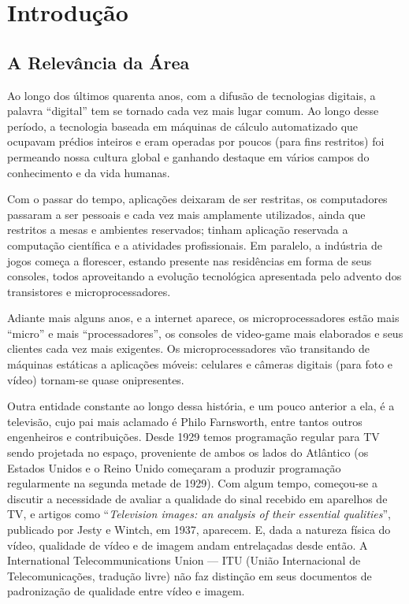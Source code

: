 \documentclass[a4paper]{book}
\begin{document}
\chapter{Introdução}

	\section{A Relevância da Área}
	Ao longo dos últimos quarenta anos, com a difusão de tecnologias digitais, a palavra ``digital'' tem se tornado cada vez mais lugar comum. Ao longo desse período, a tecnologia baseada em máquinas de cálculo automatizado que ocupavam prédios inteiros e eram operadas por poucos (para fins restritos) foi permeando nossa cultura global e ganhando destaque em vários campos do conhecimento e da vida humanas.

	Com o passar do tempo, aplicações deixaram de ser restritas, os computadores passaram a ser pessoais e cada vez mais amplamente utilizados, ainda que restritos a mesas e ambientes reservados; tinham aplicação reservada a computação científica e a atividades profissionais. Em paralelo, a indústria de jogos começa a florescer, estando presente nas residências em forma de seus consoles, todos aproveitando a evolução tecnológica apresentada pelo advento dos transistores e microprocessadores.

	Adiante mais alguns anos, e a internet aparece, os microprocessadores estão mais ``micro'' e mais ``processadores'', os consoles de video-game mais elaborados e seus clientes cada vez mais exigentes. Os microprocessadores vão transitando de máquinas estáticas a aplicações móveis: celulares e câmeras digitais (para foto e vídeo) tornam-se quase onipresentes.

	Outra entidade constante ao longo dessa história, e um pouco anterior a ela, é a televisão, cujo pai mais aclamado é Philo Farnsworth, entre tantos outros engenheiros e contribuições. Desde 1929 temos programação regular para TV sendo projetada no espaço, proveniente de ambos os lados do Atlântico (os Estados Unidos e o Reino Unido começaram a produzir programação regularmente na segunda metade de 1929).
	Com algum tempo, começou-se a discutir a necessidade de avaliar a qualidade do sinal recebido em aparelhos de TV, e artigos como ``{\em Television images: an analysis of their essential qualities}'', publicado por Jesty e Wintch, em 1937, aparecem. E, dada a natureza física do vídeo, qualidade de vídeo e de imagem andam entrelaçadas desde então. A International Telecommunications Union --- ITU (União Internacional de Telecomunicações, tradução livre) não faz distinção em seus documentos de padronização de qualidade entre vídeo e imagem. %
\end{document}
